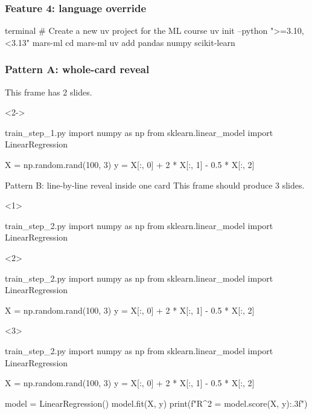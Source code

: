 \documentclass[t,10pt,aspectratio=169,rounded]{beamer}
\begin{document}
\begin{frame}[fragile]
	\frametitle{Feature 4: language override}
	\begin{codewithcard}[language=bash]{terminal}
		# Create a new uv project for the ML course
		uv init --python ">=3.10,<3.13" mars-ml
		cd mars-ml
		uv add pandas numpy scikit-learn
	\end{codewithcard}
\end{frame}

\begin{frame}[fragile]
	\frametitle{Pattern A: whole-card reveal}
	This frame has 2 slides.
	\begin{onlyenv}<2->
		\begin{codewithcard}{train_step_1.py}
			import numpy as np
			from sklearn.linear_model import LinearRegression

			X = np.random.rand(100, 3)
			y = X[:, 0] + 2 * X[:, 1] - 0.5 * X[:, 2]
		\end{codewithcard}
	\end{onlyenv}
\end{frame}

\begin{frame}[fragile]{Pattern B: line-by-line reveal inside one card}
	This frame should produce 3 slides.
	\begin{onlyenv}
		\begin{codewithcard}{train_step_2.py}
			import numpy as np
			from sklearn.linear_model import LinearRegression
		\end{codewithcard}
	\end{onlyenv}
	\begin{onlyenv}
		\begin{codewithcard}{train_step_2.py}
			import numpy as np
			from sklearn.linear_model import LinearRegression

			X = np.random.rand(100, 3)
			y = X[:, 0] + 2 * X[:, 1] - 0.5 * X[:, 2]
		\end{codewithcard}
	\end{onlyenv}
	\begin{onlyenv}
		\begin{codewithcard}{train_step_2.py}
			import numpy as np
			from sklearn.linear_model import LinearRegression

			X = np.random.rand(100, 3)
			y = X[:, 0] + 2 * X[:, 1] - 0.5 * X[:, 2]

			model = LinearRegression()
			model.fit(X, y)
			print(f"R^2 = {model.score(X, y):.3f}")
		\end{codewithcard}
	\end{onlyenv}
\end{frame}
\end{document}
